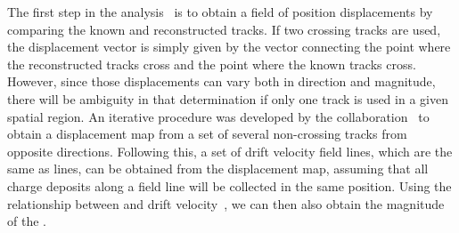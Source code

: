 The first step in the analysis~\cite{bib:uBlaser2019} is to obtain a field of position displacements by comparing the known and reconstructed tracks. If two crossing tracks are used, the displacement vector is simply given by the vector connecting the point where the reconstructed tracks cross and the point where the known tracks cross. However, since those displacements can vary both in direction and magnitude, there will be ambiguity in that determination if only one track is used in a given spatial region. An iterative procedure was developed by the  collaboration~\cite{bib:chen2018,bib:uBlaser2019} to 
obtain a displacement map from a set of several non-crossing tracks from opposite directions. Following this, a set of drift velocity field lines, which are the same as \efield lines, can be obtained from the displacement map, assuming that all charge deposits along a field line will be collected in the same position. Using the relationship between \efield and drift velocity~\cite{Li:2015rqa,Walkowiak:2000wf}, we can then also obtain 
the magnitude of the \efield.



 


